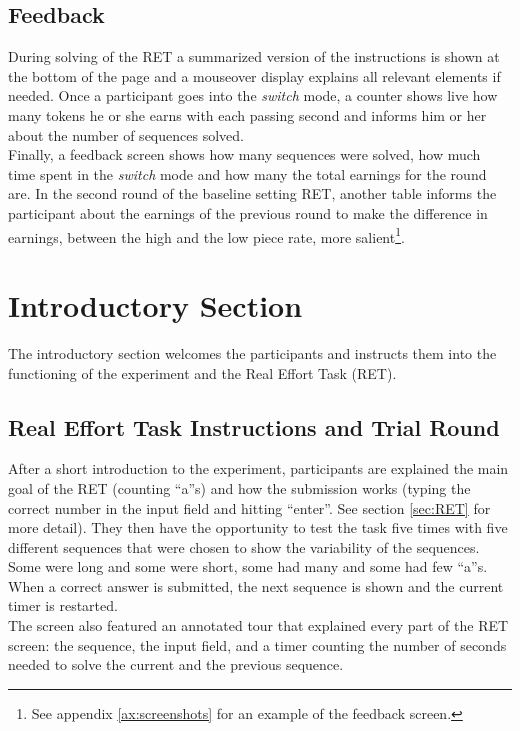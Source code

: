     \subsection{Feedback}
    
    During solving of the RET a summarized version of the instructions is shown at the bottom of the page and a mouseover display explains all relevant elements if needed. Once a participant goes into the \textit{switch} mode, a counter shows live how many tokens he or she earns with each passing second and informs him or her about the number of sequences solved.\\
    
    Finally, a feedback screen shows how many sequences were solved, how much time spent in the \textit{switch} mode and how many the total earnings for the round are. In the second round of the baseline setting RET, another table informs the participant about the earnings of the previous round to make the difference in earnings, between the high and the low piece rate, more salient\footnote{See appendix \ref{ax:screenshots} for an example of the feedback screen.}.
    
    \section{Introductory Section}
    \label{sec:intro_exp}
    
    The introductory section welcomes the participants and instructs them into the functioning of the experiment and the Real Effort Task (RET).
    
    \subsection{Real Effort Task Instructions and Trial Round}
    
    After a short introduction to the experiment, participants are explained the main goal of the RET (counting ``a''s) and how the submission works (typing the correct number in the input field and hitting ``enter''. See section \ref{sec:RET} for more detail). They then have the opportunity to test the task five times with five different sequences that were chosen to show the variability of the sequences. Some were long and some were short, some had many and some had few ``a''s. When a correct answer is submitted, the next sequence is shown and the current timer is restarted. \\
    
    The screen also featured an annotated tour that explained every part of the RET screen: the sequence, the input field, and a timer counting the number of seconds needed to solve the current and the previous sequence.
    
